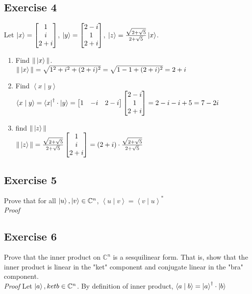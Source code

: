 \documentclass[12pt]{article}
\theoremstyle{plain}
\theoremstyle{nonumberplain}
\theoremstyle{plain}
\theoremstyle{nonumberplain}
\newcommand\1{{\bf 1}}
\newcommand{\bmat}[1]{\begin{bmatrix*} #1 \end{bmatrix*}} %
\newcommand{\C}{\mathbb{C}} %
\newcommand{\<}{\left\langle}
\renewcommand{\>}{\right\rangle}
\newcommand{\inp}[2]{\left\langle#1\mid #2\right\rangle} %
\begin{document}

\subsection{Exercise 4}
Let $\ket{x}=\bmat{1 \\ i \\ 2+i}$, $\ket{y}=\bmat{2-i \\ 1 \\ 2+i}$, $\ket{z}=\frac{\sqrt{2+\sqrt{5}}}{2+\sqrt{5}}\ket{x}$.
\begin{enumerate}
	\item Find $\Vert\ket{x}\Vert$. \\
	$\Vert\ket{x}\Vert=\sqrt{1^2+i^2+(2+i)^2}=\sqrt{1-1+(2+i)^2}=2+i$
	\item Find $\inp{x}{y}$ \\
	$\inp{x}{y}=\bra{x}^\dagger\cdot\ket{y}=\bmat{1 & -i & 2-i}\bmat{2-i \\ 1 \\ 2+i}=2-i-				i+5=7-2i$
	\item find $\Vert\ket{z}\Vert$ \\ $\Vert\ket{z}\Vert=\frac{\sqrt{2+\sqrt{5}}}{2+\sqrt{5}}			\bmat{1 \\ i \\ 2+i}=(2+i)\cdot\frac{\sqrt{2+\sqrt{5}}}{2+\sqrt{5}}$
\end{enumerate}


\subsection{Exercise 5}

Prove that for all $\ket{u},\ket{v}\in\C^n$, $\inp{u}{v}=\inp{v}{u}^*$ \\
\textit{Proof}


\subsection{Exercise 6}
Prove that the inner product on $\C^n$ is a sesquilinear form. That is, show that the inner product is linear in the "ket" component and conjugate linear in the "bra" component. \\
\textit{Proof} Let $\ket{a},ket{b}\in\C^n$. By definition of inner product, $\inp{a}{b}=\ket{a}^\dagger\cdot\ket{b}$
\end{document}

